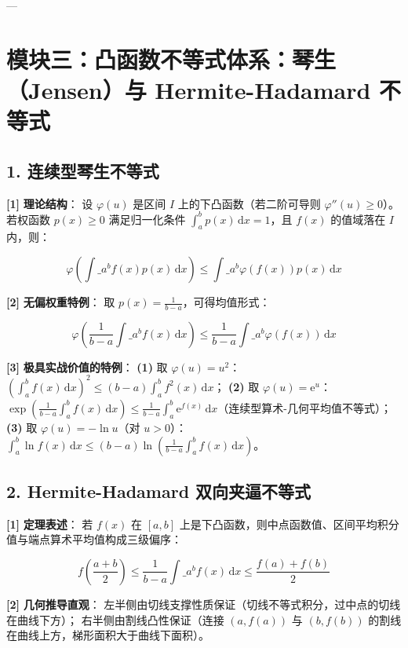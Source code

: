 \documentclass[11pt,a4paper,UTF8]{ctexart}
\begin{document}
---


\section{模块三：凸函数不等式体系：琴生（Jensen）与 Hermite-Hadamard 不等式}


\subsection{1. 连续型琴生不等式}
\begin{solbox}[分步推导与答题规范]
\textbf{[1]}  \textbf{理论结构}：
设 $\varphi(u)$ 是区间 $I$ 上的下凸函数（若二阶可导则 $\varphi''(u) \ge 0$）。若权函数 $p(x) \ge 0$ 满足归一化条件 $\int_a^b p(x)\,\mathrm{d}x = 1$，且 $f(x)$ 的值域落在 $I$ 内，则：

\begin{equation*}
\varphi\left( \int\_a^b f(x)p(x)\,\mathrm{d}x \right) \le \int\_a^b \varphi(f(x))p(x)\,\mathrm{d}x
\end{equation*}


\textbf{[2]}  \textbf{无偏权重特例}：
取 $p(x) = \frac{1}{b-a}$，可得均值形式：

\begin{equation*}
\varphi\left( \frac{1}{b-a}\int\_a^b f(x)\,\mathrm{d}x \right) \le \frac{1}{b-a}\int\_a^b \varphi(f(x))\,\mathrm{d}x
\end{equation*}


\textbf{[3]}  \textbf{极具实战价值的特例}：
\textbf{(1)}  取 $\varphi(u) = u^2$：$\left( \int_a^b f(x)\,\mathrm{d}x \right)^2 \le (b-a)\int_a^b f^2(x)\,\mathrm{d}x$；
\textbf{(2)}  取 $\varphi(u) = \mathrm{e}^u$：$\exp\left( \frac{1}{b-a}\int_a^b f(x)\,\mathrm{d}x \right) \le \frac{1}{b-a}\int_a^b \mathrm{e}^{f(x)}\,\mathrm{d}x$（连续型算术-几何平均值不等式）；
\textbf{(3)}  取 $\varphi(u) = -\ln u$（对 $u > 0$）：$\int_a^b \ln f(x)\,\mathrm{d}x \le (b-a)\ln\left(\frac{1}{b-a}\int_a^b f(x)\,\mathrm{d}x\right)$。
\end{solbox}


\subsection{2. Hermite-Hadamard 双向夹逼不等式}
\begin{solbox}[分步推导与答题规范]
\textbf{[1]}  \textbf{定理表述}：
若 $f(x)$ 在 $[a, b]$ 上是下凸函数，则中点函数值、区间平均积分值与端点算术平均值构成三级偏序：

\begin{equation*}
f\left( \frac{a+b}{2} \right) \le \frac{1}{b-a}\int\_a^b f(x)\,\mathrm{d}x \le \frac{f(a) + f(b)}{2}
\end{equation*}


\textbf{[2]}  \textbf{几何推导直观}：
左半侧由切线支撑性质保证（切线不等式积分，过中点的切线在曲线下方）；
右半侧由割线凸性保证（连接 $(a, f(a))$ 与 $(b, f(b))$ 的割线在曲线上方，梯形面积大于曲线下面积）。
\end{solbox}
\end{document}
